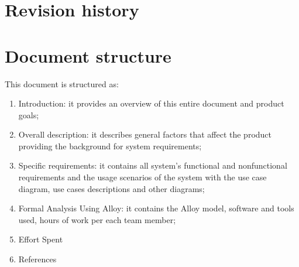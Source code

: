 \section{Revision history}

\section{Document structure}
This document is structured as:
\begin{enumerate}
\item Introduction: it provides an overview of this entire document and product goals;
\item Overall description: it describes general factors that affect the product providing the background for system requirements;
\item Specific requirements: it contains all system's functional and nonfunctional requirements and the usage scenarios of the system with the use case diagram, use cases descriptions and other diagrams;
\item Formal Analysis Using Alloy: it contains the Alloy model, software and tools used, hours of work per each team member;
\item Effort Spent
\item References
\end{enumerate}


 
